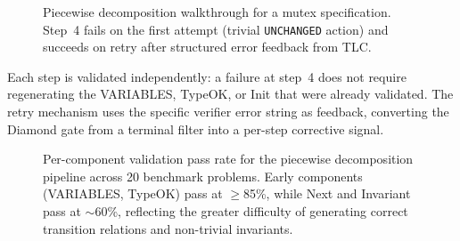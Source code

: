 \documentclass[11pt]{article}
\begin{document}
\begin{figure}[h]
\caption{Piecewise decomposition walkthrough for a mutex specification.
Step~4 fails on the first attempt (trivial \texttt{UNCHANGED} action)
and succeeds on retry after structured error feedback from TLC.}
\label{fig:piecewise-example}
\end{figure}

\noindent Each step is validated independently: a failure at step~4
does not require regenerating the VARIABLES, TypeOK, or Init that were
already validated.  The retry mechanism uses the specific verifier error
string as feedback, converting the Diamond gate from a terminal filter
into a per-step corrective signal.


\begin{figure}[h!]
\centering
{}
\caption{Per-component validation pass rate for the piecewise
decomposition pipeline across 20 benchmark problems.  Early components
(VARIABLES, TypeOK) pass at $\geq$85\%, while Next and Invariant pass
at $\sim$60\%, reflecting the greater difficulty of generating correct
transition relations and non-trivial invariants.}
\label{fig:piecewise-component-pass}
\end{figure}
\end{document}
